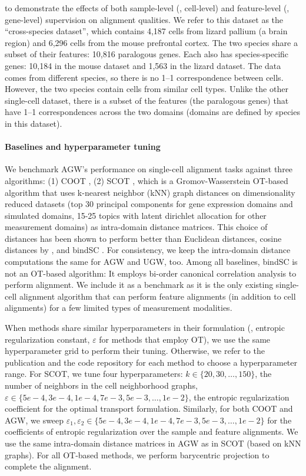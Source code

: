 to demonstrate the effects of both sample-level (\ie, cell-level) and
feature-level (\ie, gene-level) supervision on alignment qualities.
We refer to this dataset as the ``cross-species dataset'', which contains 4,187 cells
from lizard pallium (a brain region) and 6,296 cells from the mouse prefrontal cortex.
The two species share a subset of their features: 10,816 paralogous genes.
Each also has species-specific genes: 10,184 in the mouse dataset and 1,563 in the lizard dataset.
The data comes from different species, so there is no 1--1 correspondence between cells.
However, the two species contain cells from similar cell types.
Unlike the other single-cell dataset, there is a subset of the features (the paralogous genes)
that have 1--1 correspondences across the two domains (domains are defined by species in this dataset).

\paragraph{Baselines and hyperparameter tuning}
We benchmark AGW's performance on single-cell alignment tasks against three algorithms:
(1) COOT \citep{Redko20}, (2) SCOT \citep{Demetci20}, which is a Gromov-Wasserstein OT-based
algorithm that uses k-nearest neighbor (kNN) graph distances on dimensionality reduced datasets
(top 30 principal components for gene expression domains and simulated domains,
15-25 topics with latent dirichlet allocation for other measurement domains)
as intra-domain distance matrices. This choice of distances has been shown to perform
better than Euclidean distances, cosine distances by \citep{Demetci20}, and bindSC \citep{bindSC}.
For consistency, we keep the intra-domain distance computations the same for AGW and UGW, too.
Among all baselines, bindSC is not an OT-based algorithm: It employs bi-order canonical correlation
analysis to perform alignment. We include it as a benchmark as it is the only existing
single-cell alignment algorithm that can perform feature alignments (in addition to cell alignments)
for a few limited types of measurement modalities.

When methods share similar hyperparameters in their formulation (\eg,
entropic regularization constant, $\varepsilon$ for methods that employ OT),
we use the same hyperparameter grid to perform their tuning. Otherwise,
we refer to the publication and the code repository for each method to choose a hyperparameter range.
For SCOT, we tune four hyperparameters: $k \in \{20, 30, \dots, 150\}$, the number of neighbors
in the cell neighborhood graphs, $\varepsilon \in \{5e-4, 3e-4, 1e-4, 7e-3, 5e-3, \dots, 1e-2 \}$,
the entropic regularization coefficient for the optimal transport formulation. Similarly,
for both COOT and AGW, we sweep
$\varepsilon_1, \varepsilon_2 \in \{5e-4, 3e-4, 1e-4, 7e-3, 5e-3, \dots, 1e-2 \}$
for the coefficients of entropic regularization over the sample and feature alignments.
We use the same intra-domain distance matrices in AGW as in SCOT (based on kNN graphs).
For all OT-based methods, we perform barycentric projection to complete the alignment.

